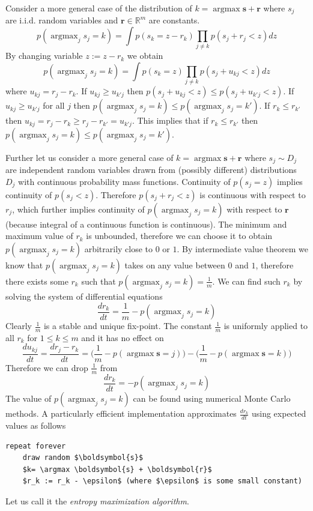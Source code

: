 \documentclass[12pt]{article}
\DeclareMathOperator*{\argmax}{argmax}
\begin{document}
Consider a more general case of the distribution of $k=\argmax \boldsymbol{s}+\boldsymbol{r}$ where $s_j$ are i.i.d. random variables and $\boldsymbol{r}\in \mathbb{R}^m$ are constants. 
\[
p(\argmax_j s_j=k) = \int p(s_k=z-r_k)\prod_{j\ne k} p(s_j+r_j< z) dz
\] 
By changing variable  $z := z-r_k$ we obtain
\[	
p(\argmax_j s_j=k) = \int  p(s_k=z) \prod_{j\ne k} p(s_j + u_{kj} < z) dz 
\]
where $u_{kj}=r_j-r_k$. If $u_{kj} \ge u_{k'j}$ then $p(s_j + u_{kj} < z) \le p(s_j + u_{k'j}< z)$. If $u_{kj} \ge u_{k'j}$  for all $j$ then $p(\argmax_j s_j=k) \le p(\argmax_j s_j=k')$. If $r_k \le r_{k'}$ then $u_{kj} = r_j-r_k \ge r_j-r_{k'} = u_{k'j}$. This implies that if $r_k \le r_{k'}$ then $p(\argmax_j s_j=k) \le p(\argmax_j s_j=k')$. 

Further let us consider a more general case of  $k=\argmax \boldsymbol{s}+\boldsymbol{r}$ where $s_j\sim D_j$ are independent random variables drawn from (possibly different) distributions $D_j$ with continuous probability mass functions. Continuity of $p(s_j=z)$ implies continuity of $p(s_j < z)$. Therefore $p(s_j +r_j< z)$ is continuous with respect to $r_j$, which further implies continuity of  $p(\argmax_j s_j=k)$ with respect to $\boldsymbol{r}$ (because integral of a continuous function is continuous). The minimum and maximum value of $r_k$ is unbounded, therefore we can choose it to obtain $p(\argmax_j s_j=k)$ arbitrarily close to $0$ or $1$. By intermediate value theorem we know that $p(\argmax_j s_j=k)$ takes on any value between $0$ and $1$, therefore there exists some $r_k$ such that  $p(\argmax_j s_j=k)=\frac{1}{m}$. We can find such $r_k$ by solving the system of  differential equations
\[
\frac{d r_k}{d t} = \frac{1}{m}-p(\argmax_j s_j=k)
\]
Clearly $\frac{1}{m}$ is a stable and unique fix-point. 
The constant $\frac{1}{m}$ is uniformly applied to all $r_k$ for $1 \le k \le m$ and it has no effect on 
\[
\frac{du_{kj}}{dt}=\frac{dr_j-r_k}{dt} = \big(\frac{1}{m}-p(\argmax \boldsymbol{s}=j)\big)-\big(\frac{1}{m}-p(\argmax \boldsymbol{s}=k)\big)
\]
Therefore we can drop $\frac{1}{m}$ from 
\[
\frac{d r_k}{d t} = -p(\argmax_j s_j=k)
\]
The value of $p(\argmax_j s_j=k)$ can be found using numerical Monte Carlo methods. A particularly efficient implementation approximates $\frac{d r_k}{d t}$ using expected values as follows
\begin{lstlisting}
repeat forever
    draw random $\boldsymbol{s}$
    $k= \argmax \boldsymbol{s} + \boldsymbol{r}$
    $r_k := r_k - \epsilon$ (where $\epsilon$ is some small constant)
\end{lstlisting}
Let us call it the \textit{entropy maximization algorithm}. 
\end{document}
